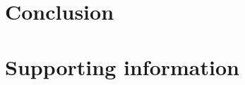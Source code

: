 \documentclass[10pt,letterpaper]{article}
\begin{document}


\section*{Conclusion}


\section*{Supporting information}



\end{document}
